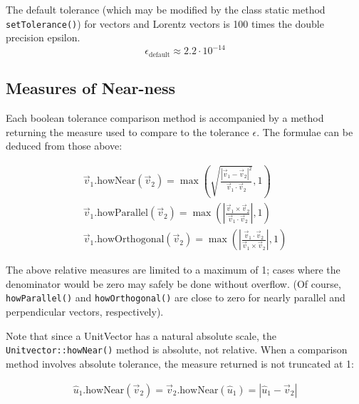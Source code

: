 \documentclass[twoside,12pt]{article}
\begin{document}
\noindent

The default tolerance (which may be modified by the class static method
{\tt setTolerance()}) for vectors and Lorentz vectors
is 100 times the double precision epsilon.
\begin{equation}
  \epsilon_{\mbox{default}} \approx 2.2 \cdot 10^{-14}
\label{eq:epsildef}
\end{equation}

\subsection {Measures of Near-ness}

Each boolean tolerance comparison method is accompanied by a method returning
the measure used to compare to the tolerance $\epsilon$.
The formulae can be deduced from those above:

\begin{eqnarray}
\vec{v}_{1} \mbox{.howNear} (\vec{v}_{2}) =
  \max \left( \sqrt{ \frac {\left| \vec{v}_{1} - \vec{v}_{2} \right| ^ 2}
  {\vec{v}_{1} \cdot \vec{v}_{2}} } , 1 \right)
  \label{eq:howNear} \\
\vec{v}_{1} \mbox{.howParallel} (\vec{v}_{2}) =
  \max \left( \left| \frac{\vec{v}_{1} \times \vec{v}_{2}}
  {\vec{v}_{1} \cdot  \vec{v}_{2}}  \right| , 1 \right)
  \label{eq:howPar} \\
\vec{v}_{1} \mbox{.howOrthogonal} (\vec{v}_{2}) =
  \max \left( \left| \frac{\vec{v}_{1} \cdot \vec{v}_{2}}
		    {\vec{v}_{1} \times  \vec{v}_{2}}  \right| , 1 \right)
  \label{eq:howOrtho}
\end{eqnarray}

\noindent
The above relative measures are limited to a maximum of 1; cases where
the denominator would be zero may safely be done without overflow.
(Of course, {\tt howParallel()} and {\tt howOrthogonal()} are close to
zero for nearly parallel and perpendicular vectors, respectively).

Note that since a UnitVector has a natural absolute scale, the
{\tt Unitvector::howNear()} method is absolute, not relative.
When a comparison method involves absolute tolerance, the measure returned
is not truncated at 1:

\begin{eqnarray}
\hat{u}_{1} \mbox{.howNear} (\vec{v}_{2}) =
  \vec{v}_{2} \mbox{.howNear} (\hat{u}_{1}) =
  \left| \hat{u}_{1} - \vec{v}_{2} \right|
  \label{eq:howNear:2}
\end{eqnarray}
\end{document}
